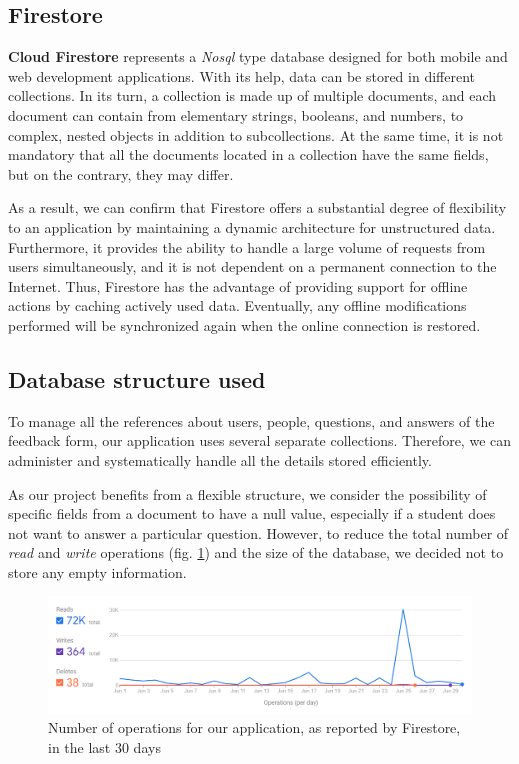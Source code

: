     \subsection{Firestore} \label{5:firestore}
    
    \textbf{Cloud Firestore} represents a \textit{No\acrshort{sql}} type database designed for both mobile and web development applications. With its help, data can be stored in different collections. In its turn, a collection is made up of multiple documents, and each document can contain from elementary strings, booleans, and numbers, to complex, nested objects in addition to subcollections. At the same time, it is not mandatory that all the documents located in a collection have the same fields, but on the contrary, they may differ.
    
    As a result, we can confirm that Firestore offers a substantial degree of flexibility to an application by maintaining a dynamic architecture for unstructured data. Furthermore, it provides the ability to handle a large volume of requests from users simultaneously, and it is not dependent on a permanent connection to the Internet. Thus, Firestore has the advantage of providing support for offline actions by caching actively used data. Eventually, any offline modifications performed will be synchronized again when the online connection is restored.
    
    \subsection{Database structure used} \label{5:database_structure}
    
    To manage all the references about users, people, questions, and answers of the feedback form, our application uses several separate collections. Therefore, we can administer and systematically handle all the details stored efficiently.
    
    As our project benefits from a flexible structure, we consider the possibility of specific fields from a document to have a null value, especially if a student does not want to answer a particular question. However, to reduce the total number of \textit{read} and \textit{write} operations (fig. \ref{5:fig:firestore_operations}) and the size of the database, we decided not to store any empty information.
    
    \begin{figure}[!ht]
        \centering
         \includegraphics[width=1\textwidth]{figures/charts/firestore_operations.png}
         \caption{Number of operations for our application, as reported by Firestore, in the last 30 days}
        \label{5:fig:firestore_operations}
    \end{figure}

